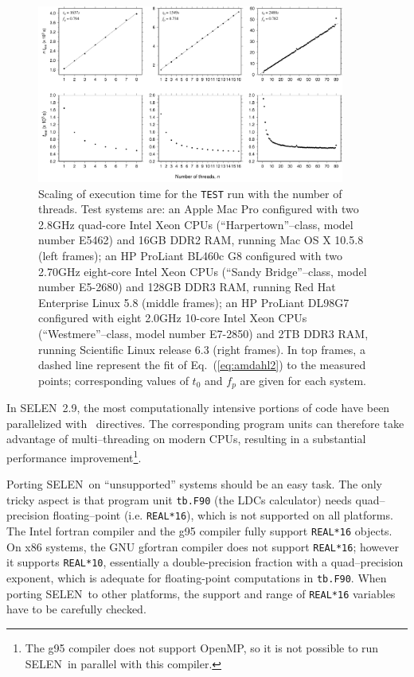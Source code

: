 \documentclass[11pt,fleqn,a4paper,titlepage]{article}
\newcommand\selen{\textsf{SELEN~}}
\begin{document}
{\begin{figure}[t]
\begin{center}
\includegraphics[width=0.9\textwidth,angle=0]{./Figures/scaling-new.pdf}
\caption[Execution time scaling]{\small{Scaling of execution time for the \texttt{TEST} run with the number of threads. Test systems are: an Apple Mac Pro configured with two 2.8GHz quad-core Intel Xeon CPUs (``Harpertown''--class, model number E5462) and 16GB DDR2 RAM, running Mac OS X 10.5.8 (left frames); an HP ProLiant BL460c G8 configured with two 2.70GHz eight-core Intel Xeon CPUs (``Sandy Bridge''--class, model number E5-2680) and 128GB DDR3 RAM, running Red Hat Enterprise Linux 5.8 (middle frames); 
an HP ProLiant DL98G7 configured with eight 2.0GHz 10-core Intel Xeon CPUs (``Westmere''--class, model number E7-2850) and 2TB DDR3 RAM, running Scientific Linux release 6.3 (right frames).  In top frames, a dashed line represent the fit of Eq.~(\ref{eq:amdahl2}) to the measured points; corresponding values of $t_0$ and $f_p$ are given for each system.}}
\label{fig:scaling}
\end{center}
\end{figure}

In \selen 2.9, the most computationally intensive portions of code have been parallelized with~\cite{Openmp_2005} directives. The corresponding program units can therefore take advantage of multi--threading on modern CPUs, resulting in a substantial performance improvement\footnote{The g95 compiler does not support OpenMP, so it is not possible to run \selen in parallel with this compiler.}. 

Porting \selen on ``unsupported'' systems should be an easy task.  The only tricky aspect is that program unit \texttt{tb.F90} (the LDCs calculator)  needs quad--precision floating--point (i.e. \texttt{REAL*16}), which is not supported on all platforms.  The Intel fortran compiler and the g95 compiler fully support \texttt{REAL*16} objects. On x86 systems, the GNU gfortran compiler does {not} support \texttt{REAL*16}; however it supports \texttt{REAL*10}, essentially a double-precision fraction with a quad--precision exponent, which is adequate for floating-point computations in \texttt{tb.F90}.  When porting \selen to other platforms, the support and range of \texttt{REAL*16} variables have to be carefully checked.

}
\end{document}

